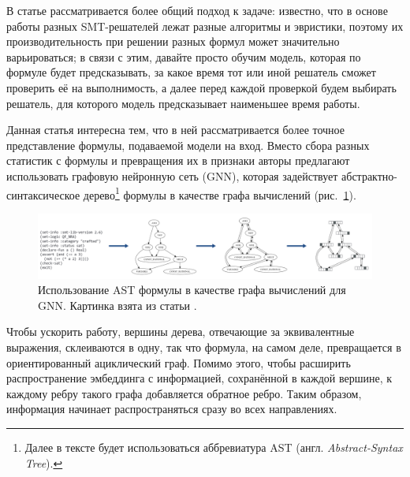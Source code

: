  \label{gnn-for-scheduling-of-smt-solvers}

В статье \cite{gnn-for-scheduling-paper} рассматривается более общий подход к задаче: известно, что в основе работы разных SMT-решателей лежат разные алгоритмы и эвристики, поэтому их производительность при решении разных формул может значительно варьироваться; в связи с этим, давайте просто обучим модель, которая по формуле будет предсказывать, за какое время тот или иной решатель сможет проверить её на выполнимость, а далее перед каждой проверкой будем выбирать решатель, для которого модель предсказывает наименьшее время работы.

Данная статья интересна тем, что в ней рассматривается более точное представление формулы, подаваемой модели на вход. Вместо сбора разных статистик с формулы и превращения их в признаки авторы предлагают использовать графовую нейронную сеть (GNN), которая задействует абстрактно-синтаксическое дерево\footnote{Далее в тексте будет использоваться аббревиатура AST (англ. \textit{Abstract-Syntax Tree}).} формулы в качестве графа вычислений (рис.~\ref{gnn-for-scheduling-architecture}).

\begin{figure}[ht]
\begin{center}
    \includegraphics[scale=0.24]{./assets/gnn-for-scheduling-architecture.png}
    \caption{\label{gnn-for-scheduling-architecture} Использование AST формулы в качестве графа вычислений для GNN. Картинка взята из статьи \cite{gnn-for-scheduling-paper}.}
\end{center}
\end{figure}

Чтобы ускорить работу, вершины дерева, отвечающие за эквивалентные выражения, склеиваются в одну, так что формула, на самом деле, превращается в ориентированный ациклический граф. Помимо этого, чтобы расширить распространение эмбеддинга с информацией, сохранённой в каждой вершине, к каждому ребру такого графа добавляется обратное ребро. Таким образом, информация начинает распространяться сразу во всех направлениях.

